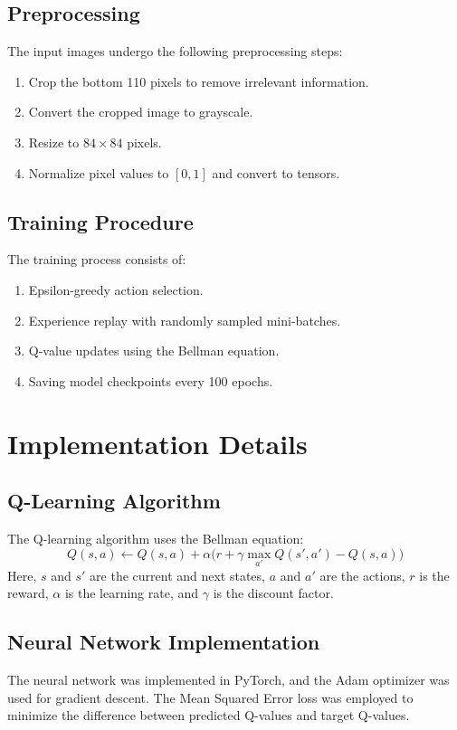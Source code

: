 \documentclass[a4paper,12pt]{article}
\begin{document}
\subsection{Preprocessing}
The input images undergo the following preprocessing steps:
\begin{enumerate}
    \item Crop the bottom 110 pixels to remove irrelevant information.
    \item Convert the cropped image to grayscale.
    \item Resize to \(84 \times 84\) pixels.
    \item Normalize pixel values to \([0, 1]\) and convert to tensors.
\end{enumerate}

\subsection{Training Procedure}
The training process consists of:
\begin{enumerate}
    \item Epsilon-greedy action selection.
    \item Experience replay with randomly sampled mini-batches.
    \item Q-value updates using the Bellman equation.
    \item Saving model checkpoints every 100 epochs.
\end{enumerate}

\section{Implementation Details}
\subsection{Q-Learning Algorithm}
The Q-learning algorithm uses the Bellman equation:
\[
Q(s, a) \leftarrow Q(s, a) + \alpha \Big( r + \gamma \max_{a'} Q(s', a') - Q(s, a) \Big)
\]
Here, \(s\) and \(s'\) are the current and next states, \(a\) and \(a'\) are the actions, \(r\) is the reward, \(\alpha\) is the learning rate, and \(\gamma\) is the discount factor.

\subsection{Neural Network Implementation}
The neural network was implemented in PyTorch, and the Adam optimizer was used for gradient descent. The Mean Squared Error loss was employed to minimize the difference between predicted Q-values and target Q-values.
\end{document}
